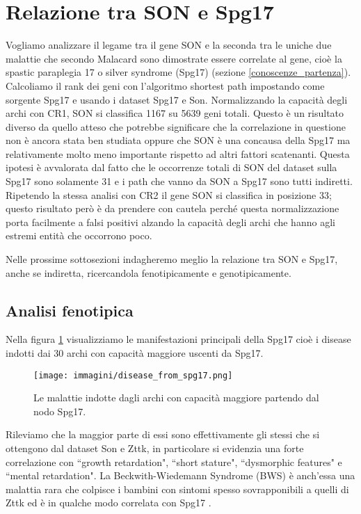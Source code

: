\documentclass[12pt]{report}
\newcommand{\quotes}[1]{``#1"}
\begin{document}
\FloatBarrier
\section{Relazione tra SON e Spg17 \label{son_spg17}}

Vogliamo analizzare il legame tra il gene SON e la seconda tra le uniche due malattie che secondo Malacard sono dimostrate essere correlate al gene, cioè la spastic paraplegia 17 o silver syndrome (Spg17) (sezione \ref{conoscenze_partenza}). Calcoliamo il rank dei geni con l'algoritmo shortest path impostando come sorgente Spg17 e usando i dataset Spg17 e Son. Normalizzando la capacità degli archi con CR1, SON si classifica 1167 su 5639 geni totali. Questo è un risultato diverso da quello atteso che potrebbe significare che la correlazione in questione non è ancora stata ben studiata oppure che SON è una concausa della Spg17 ma relativamente molto meno importante rispetto ad altri fattori scatenanti. Questa ipotesi è avvalorata dal fatto che le occorrenze totali di SON del dataset sulla Spg17 sono solamente 31 e i path che vanno da SON a Spg17 sono tutti indiretti. Ripetendo la stessa analisi con CR2 il gene SON si classifica in posizione 33; questo risultato però è da prendere con cautela perché questa normalizzazione porta facilmente a falsi positivi alzando la capacità degli archi che hanno agli estremi entità che occorrono poco.

Nelle prossime sottosezioni indagheremo meglio la relazione tra SON e Spg17, anche se indiretta, ricercandola fenotipicamente e genotipicamente. 

\subsection{Analisi fenotipica}
Nella figura \ref{fig:disease_from_spg17} visualizziamo le manifestazioni principali della Spg17 cioè i disease indotti dai 30 archi con capacità maggiore uscenti da Spg17.

\begin{figure}[!htb]
\centering
\texttt{[image: immagini/disease\_from\_spg17.png]}
\caption{\footnotesize{Le malattie indotte dagli archi con capacità maggiore partendo dal nodo Spg17. }}
\label{fig:disease_from_spg17}
\end{figure}

Rileviamo che la maggior parte di essi sono effettivamente gli stessi che si ottengono dal dataset Son e Zttk, in particolare si evidenzia una forte correlazione con \quotes{growth retardation}, \quotes{short stature}, \quotes{dysmorphic features} e \quotes{mental retardation}. La Beckwith-Wiedemann Syndrome (BWS) è anch'essa una malattia rara che colpisce i bambini con sintomi spesso sovrapponibili a quelli di Zttk ed è in qualche modo correlata con Spg17 \cite{bwsdisease}. 
\end{document}
